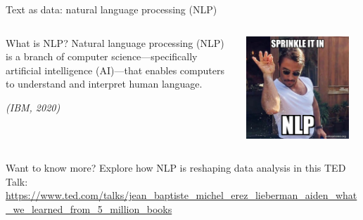 \documentclass[handout]{beamer}
\begin{document}
\begin{frame}{Text as data: natural language processing (NLP)}

    \begin{columns}[T] %
        \begin{column}{0.6\textwidth}
            \begin{block}{What is NLP?}
                Natural language processing (NLP) is a branch of computer science—specifically artificial intelligence (AI)—that enables computers to understand and interpret human language. 
            \end{block}
            \vspace{0.3cm}
            \small{\textit{(IBM, 2020)}}
        \end{column}

        \begin{column}{0.2\textwidth}
            \vspace{0.5cm}
            \includegraphics[width=0.9\textwidth]{../pictures/sprinkle-it-in.jpg}
        \end{column}
    \end{columns}

    \vspace{0.4cm}

    \begin{block}{Want to know more?}
        Explore how NLP is reshaping data analysis in this TED Talk: \\
        \small{\url{https://www.ted.com/talks/jean_baptiste_michel_erez_lieberman_aiden_what_we_learned_from_5_million_books}}
    \end{block}

\end{frame}
\end{document}
